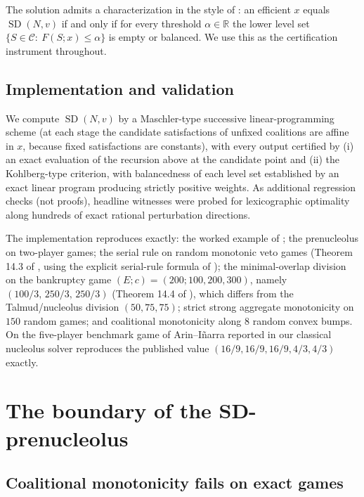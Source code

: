 \documentclass[11pt]{article}
\newcommand{\R}{\mathbb{R}}
\newcommand{\SD}{\operatorname{SD}}
\begin{document}
The solution admits a characterization in the style of
\citet{Kohlberg71} \citep{ArinKatsev2011,ArinKatsev2018}: an efficient $x$ equals $\SD(N,v)$ if
and only if for every threshold $\alpha\in\R$ the lower level set
$\{S\in\mathcal{C}:\ F(S;x)\le\alpha\}$ is empty or balanced. We use this as
the certification instrument throughout.

\subsection{Implementation and validation}\label{sec:sd-impl}

We compute $\SD(N,v)$ by a Maschler-type successive linear-programming
scheme (at each stage the candidate satisfactions of unfixed coalitions are
affine in $x$, because fixed satisfactions are constants), with every output
certified by (i) an exact evaluation of the recursion above at the candidate
point and (ii) the Kohlberg-type criterion, with balancedness of each level
set established by an exact linear program producing strictly positive
weights. As additional regression checks (not proofs), headline witnesses
were probed for lexicographic optimality along hundreds of exact rational
perturbation directions.

The implementation reproduces exactly: the worked example of
\citet{ArinKatsev2018}; the prenucleolus on two-player games; the serial rule
on random monotonic veto games (Theorem 14.3 of \citealp{ArinKatsev2018}, using
the explicit serial-rule formula of \citealp{ArinFeltkamp2012}); the
minimal-overlap division on the bankruptcy game
$(E;c)=(200;100,200,300)$, namely $(100/3,\,250/3,\,250/3)$ (Theorem 14.4 of
\citealp{ArinKatsev2018}), which differs from the Talmud/nucleolus division
$(50,75,75)$; strict strong aggregate monotonicity on $150$ random games; and
coalitional monotonicity along $8$ random convex bumps. On the five-player
benchmark game of Arin--I\~narra reported in \citet{Inarra2020} our classical
nucleolus solver reproduces the published value
$(16/9,16/9,16/9,4/3,4/3)$ exactly.

\section{The boundary of the SD-prenucleolus}\label{sec:sd-results}

\subsection{Coalitional monotonicity fails on exact games}
\end{document}
